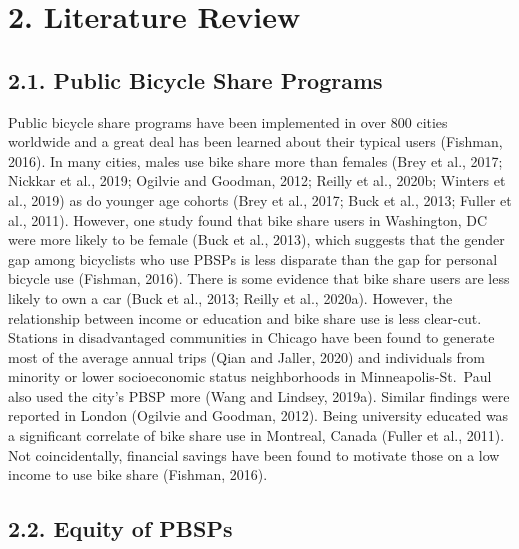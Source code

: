\documentclass[]{elsarticle} %
\providecommand{\DIFaddtex}[1]{{\protect\color{blue}\uwave{#1}}} %
\providecommand{\DIFaddbegin}{} %
\providecommand{\DIFaddend}{} %
\providecommand{\DIFadd}[1]{\texorpdfstring{\DIFaddtex{#1}}{#1}} %
\newcommand{\DIFaddincludegraphics}[2][]{{\color{blue}\fbox{\DIFOincludegraphics[#1]{#2}}}} %
\DeclareRobustCommand{\DIFaddbegin}{\DIFOaddbegin \let\includegraphics\DIFaddincludegraphics} %
\DeclareRobustCommand{\DIFaddend}{\DIFOaddend \let\includegraphics\DIFOincludegraphics} %
\begin{document}
\hypertarget{literature-review}{%
\section{2. Literature Review}\label{literature-review}}

\hypertarget{public-bicycle-share-programs}{%
\subsection{2.1. Public Bicycle Share
Programs}\label{public-bicycle-share-programs}}

Public bicycle share programs have been implemented in over 800 cities
worldwide and a great deal has been learned about their typical users \DIFaddbegin \DIFadd{to
date }\DIFaddend (Fishman, 2016). In many cities, males use bike share more than
females (Brey et al., 2017; Nickkar et al., 2019; Ogilvie and Goodman,
2012; Reilly et al., 2020b; \DIFaddbegin \DIFadd{Wang and Akar, 2019; }\DIFaddend Winters et al., 2019)
as do younger age cohorts (Brey et al., 2017; Buck et al., 2013; Fuller
et al., 2011). However, one study found that bike share users in
Washington, DC were more likely to be female (Buck et al., 2013), which
suggests that the gender gap among bicyclists who use PBSPs is less
disparate than the gap for personal bicycle use (Fishman, 2016). There
is some evidence that bike share users are less likely to own a car
(Buck et al., 2013; Reilly et al., 2020a). However, the relationship
between income or education and bike share use is less clear-cut.
Stations in disadvantaged communities in Chicago have been found to
generate most of the average annual trips (Qian and Jaller, 2020) and
individuals from minority or lower socioeconomic status neighborhoods in
Minneapolis-St.~Paul also used the city's PBSP more (Wang and Lindsey,
2019a). Similar findings were reported in London (Ogilvie and Goodman,
2012). Being university educated was a significant correlate of bike
share use in Montreal, Canada (Fuller et al., 2011). Not coincidentally,
financial savings have been found to motivate those on a low income to
use bike share (Fishman, 2016).

\hypertarget{equity-of-pbsps}{%
\subsection{2.2. Equity of PBSPs}\label{equity-of-pbsps}}
\end{document}
